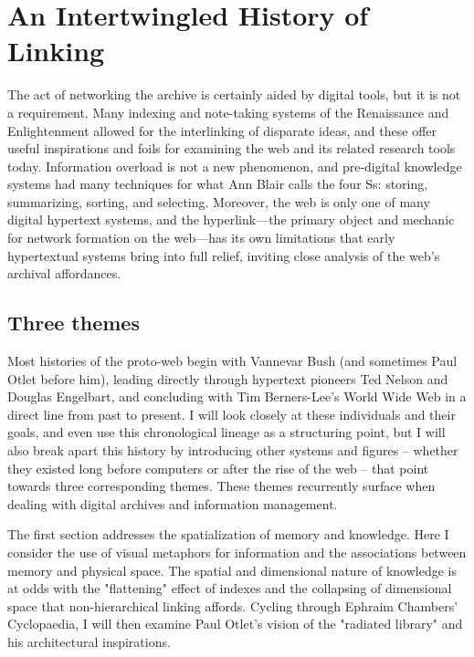 \chapter{An Intertwingled History of Linking}


The act of networking the archive is certainly aided by digital tools, but it is not a requirement. Many indexing and note-taking systems of the Renaissance and Enlightenment allowed for the interlinking of disparate ideas, and these offer useful inspirations and foils for examining the web and its related research tools today. Information overload is not a new phenomenon, and pre-digital knowledge systems had many techniques for what Ann Blair calls the four Ss: storing, summarizing, sorting, and selecting.  Moreover, the web is only one of many digital hypertext systems, and the hyperlink---the primary object and mechanic for network formation on the web---has its own limitations that early hypertextual systems bring into full relief, inviting close analysis of the web's archival affordances.

\section{Three themes}

Most histories of the proto-web begin with Vannevar Bush (and sometimes Paul Otlet before him), leading directly through hypertext pioneers Ted Nelson and Douglas Engelbart, and concluding with Tim Berners-Lee's World Wide Web in a direct line from past to present. I will look closely at these individuals and their goals, and even use this chronological lineage as a structuring point, but I will also break apart this history by introducing other systems and figures – whether they existed long before computers or after the rise of the web – that point towards three corresponding themes. These themes recurrently surface when dealing with digital archives and information management.

The first section addresses the spatialization of memory and knowledge. Here I consider the use of visual metaphors for information and the associations between memory and physical space. The spatial and dimensional nature of knowledge is at odds with the "flattening" effect of indexes and the collapsing of dimensional space that non-hierarchical linking affords. Cycling through Ephraim Chambers' Cyclopaedia, I will then examine Paul Otlet's vision of the "radiated library" and his architectural inspirations.

